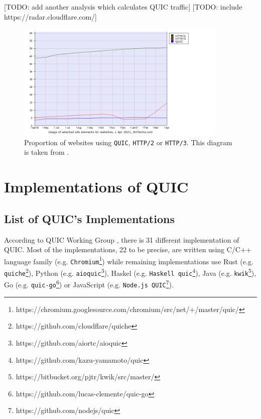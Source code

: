 \documentclass[12pt,a4paper,twoside,openright]{report}
\begin{document}
[TODO: add another analysis which calculates QUIC traffic]
[TODO: include https://radar.cloudflare.com/]


    \begin{figure}[ht]
    \centering
    \includegraphics[width=0.9\textwidth]{figs/Adoption_comparison_Between_http2_http3_quic.png}
    \caption{Proportion of websites using \texttt{QUIC}, \texttt{HTTP/2} or \texttt{HTTP/3}. This diagram is taken from \cite{bib_Adoption_comparison_Between_http2_http3_quic}.}
    \label{fig:Adoption_comparison_Between_http2_http3_quic}
    \end{figure}









\section{Implementations of QUIC}

\subsection{List of QUIC's Implementations} \label{List_of_QUIC_implementations}
According to QUIC Working Group \cite{number_of_QUIC_implementations}, there is 31 different implementation of QUIC. Most of the implementations, 22 to be precise, are written using C/C++ language family (e.g. \texttt{Chromium}\footnote{https://chromium.googlesource.com/chromium/src/net/+/master/quic/}) while remaining implementations use Rust (e.g. \texttt{quiche}\footnote{https://github.com/cloudflare/quiche}), Python (e.g. \texttt{aioquic}\footnote{https://github.com/aiortc/aioquic}), Haskel (e.g. \texttt{Haskell quic}\footnote{https://github.com/kazu-yamamoto/quic}), Java (e.g. \texttt{kwik}\footnote{https://bitbucket.org/pjtr/kwik/src/master/}), Go (e.g. \texttt{quic-go}\footnote{https://github.com/lucas-clemente/quic-go}) or JavaScript (e.g. \texttt{Node.js QUIC}\footnote{https://github.com/nodejs/quic}).
\end{document}
